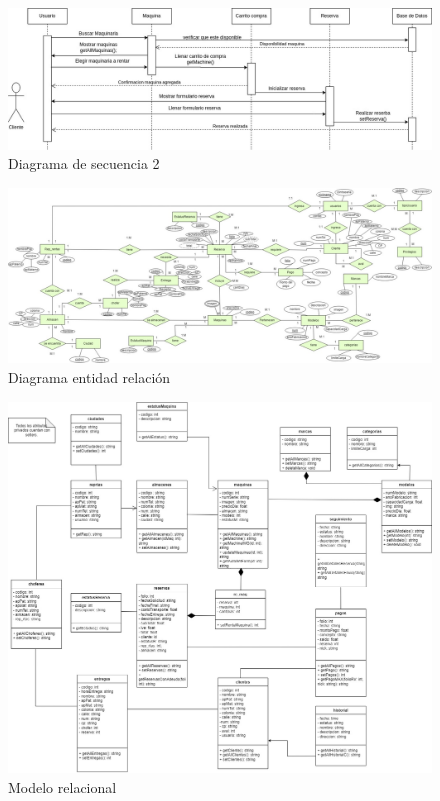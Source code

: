 \documentclass{article}
\begin{document}
\begin{figure}
    \centering
    \includegraphics[width=1.1\linewidth]{sec2.jpg}
    \caption{Diagrama de secuencia 2}
    \label{fig:enter-label}
\end{figure}

\begin{figure}
    \centering
    \includegraphics[width=1.2\linewidth]{der.jpg}
    \caption{Diagrama entidad relación}
    \label{fig:enter-label}
\end{figure}

\begin{figure}
    \centering
    \includegraphics[width=1.1\linewidth]{mr.jpg}
    \caption{Modelo relacional}
    \label{fig:enter-label}
\end{figure}
\end{document}
